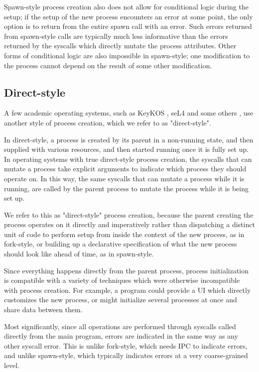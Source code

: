 \documentclass[sigplan]{acmart}
\begin{document}
Spawn-style process creation also does not allow for conditional logic during the setup;
if the setup of the new process encounters an error at some point,
the only option is to return from the entire spawn call with an error.
Such errors returned from spawn-style calls
are typically much less informative
than the errors returned by the syscalls which directly mutate the process attributes.
Other forms of conditional logic are also impossible in spawn-style;
one modification to the process cannot depend on the result of some other modification.
\subsection{Direct-style}
A few academic operating systems, such as KeyKOS \cite{keykos}, seL4 \cite{sel4}
and some others \cite{exokernel} \cite{fuschia} \cite{singularity},
use another style of process creation, which we refer to as "direct-style".

In direct-style, a process is created by its parent in a non-running state,
and then supplied with various resources,
and then started running once it is fully set up.
In operating systems with true direct-style process creation,
the syscalls that can mutate a process
take explicit arguments to indicate which process they should operate on.
In this way, the same syscalls that can mutate a process while it is running,
are called by the parent process to mutate the process while it is being set up.

We refer to this as "direct-style" process creation,
because the parent creating the process operates on it directly and imperatively
rather than dispatching a distinct unit of code to perform setup from inside the context of the new process,
as in fork-style,
or building up a declarative specification of what the new process should look like ahead of time,
as in spawn-style.

Since everything happens directly from the parent process,
process initialization is compatible with a variety of techniques
which were otherwise incompatible with process creation.
For example, a program could provide a UI which directly customizes the new process,
or might initialize several processes at once and share data between them.

Most significantly,
since all operations are performed through syscalls called directly from the main program,
errors are indicated in the same way as any other syscall error.
This is unlike fork-style, which needs IPC to indicate errors,
and unlike spawn-style, which typically indicates errors at a very coarse-grained level.
\end{document}
